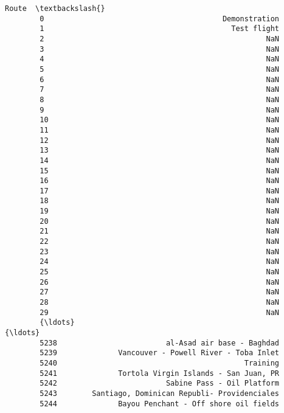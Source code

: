 \documentclass[11pt]{article}
\begin{document}
\begin{Verbatim}[commandchars=\\\{\}]
                                                          Route  \textbackslash{}
        0                                         Demonstration   
        1                                           Test flight   
        2                                                   NaN   
        3                                                   NaN   
        4                                                   NaN   
        5                                                   NaN   
        6                                                   NaN   
        7                                                   NaN   
        8                                                   NaN   
        9                                                   NaN   
        10                                                  NaN   
        11                                                  NaN   
        12                                                  NaN   
        13                                                  NaN   
        14                                                  NaN   
        15                                                  NaN   
        16                                                  NaN   
        17                                                  NaN   
        18                                                  NaN   
        19                                                  NaN   
        20                                                  NaN   
        21                                                  NaN   
        22                                                  NaN   
        23                                                  NaN   
        24                                                  NaN   
        25                                                  NaN   
        26                                                  NaN   
        27                                                  NaN   
        28                                                  NaN   
        29                                                  NaN   
        {\ldots}                                                 {\ldots}   
        5238                         al-Asad air base - Baghdad   
        5239              Vancouver - Powell River - Toba Inlet   
        5240                                           Training   
        5241              Tortola Virgin Islands - San Juan, PR   
        5242                         Sabine Pass - Oil Platform   
        5243        Santiago, Dominican Republi- Providenciales   
        5244              Bayou Penchant - Off shore oil fields   

\end{Verbatim}
\end{document}
